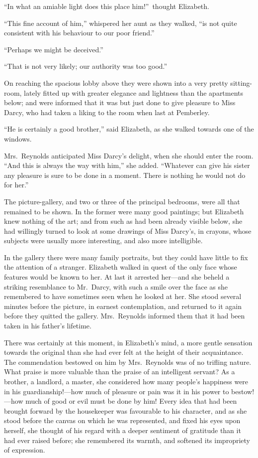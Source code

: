 \documentclass[12pt,english,oneside]{book}
\begin{document}
{}``In what an amiable light does this place him!''\ thought Elizabeth.

{}``This fine account of him,'' whispered her aunt as they walked,
{}``is not quite consistent with his behaviour to our poor friend.''

{}``Perhaps we might be deceived.''

{}``That is not very likely; our authority was too good.''

On reaching the spacious lobby above they were shown into a very pretty
sitting-room, lately fitted up with greater elegance and lightness
than the apartments below; and were informed that it was but just
done to give pleasure to Miss Darcy, who had taken a liking to the
room when last at Pemberley.

{}``He is certainly a good brother,'' said Elizabeth, as she walked
towards one of the windows.

Mrs.\ Reynolds anticipated Miss Darcy's delight, when she should
enter the room. {}``And this is always the way with him,'' she added.
{}``Whatever can give his sister any pleasure is sure to be done
in a moment. There is nothing he would not do for her.''

The picture-gallery, and two or three of the principal bedrooms, were
all that remained to be shown. In the former were many good paintings;
but Elizabeth knew nothing of the art; and from such as had been already
visible below, she had willingly turned to look at some drawings of
Miss Darcy's, in crayons, whose subjects were usually more interesting,
and also more intelligible.

In the gallery there were many family portraits, but they could have
little to fix the attention of a stranger. Elizabeth walked in quest
of the only face whose features would be known to her. At last it
arrested her\mbox{---}and she beheld a striking resemblance to Mr.\ Darcy,
with such a smile over the face as she remembered to have sometimes
seen when he looked at her. She stood several minutes before the picture,
in earnest contemplation, and returned to it again before they quitted
the gallery. Mrs.\ Reynolds informed them that it had been taken
in his father's lifetime.

There was certainly at this moment, in Elizabeth's mind, a more gentle
sensation towards the original than she had ever felt at the height
of their acquaintance. The commendation bestowed on him by Mrs.\ Reynolds
was of no trifling nature. What praise is more valuable than the praise
of an intelligent servant? As a brother, a landlord, a master, she
considered how many people's happiness were in his guardianship!\mbox{---}how
much of pleasure or pain was it in his power to bestow!\mbox{---}how
much of good or evil must be done by him! Every idea that had been
brought forward by the housekeeper was favourable to his character,
and as she stood before the canvas on which he was represented, and
fixed his eyes upon herself, she thought of his regard with a deeper
sentiment of gratitude than it had ever raised before; she remembered
its warmth, and softened its impropriety of expression.
\end{document}
